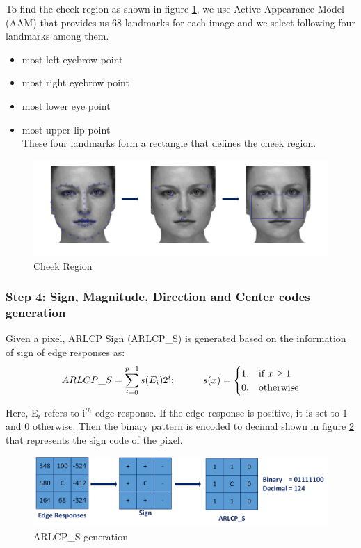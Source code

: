 \documentclass[12pt]{article}
\newcommand\tab[1][1cm]{\hspace*{#1}}
\begin{document}
To find the cheek region as shown in figure \ref{fig:Cheek_Region}, we use Active Appearance Model (AAM) that provides us 68 landmarks for each image and we select following four landmarks among them.
\begin{itemize}
	\item most left eyebrow point
	\item most right eyebrow point
	\item most lower eye point
	\item most upper lip point\\
	These four landmarks form a rectangle that defines the cheek region.	
\end{itemize}  
\begin{figure}[H]
	\begin{center}
		\centering
		\includegraphics[width=\textwidth]{Cheek_Region.png}
		\caption{Cheek Region}
			\label{fig:Cheek_Region}
	\end{center}
\end{figure} 

\subsubsection{Step 4: Sign, Magnitude, Direction and Center codes generation} 
Given a pixel, ARLCP Sign (ARLCP\_S) is generated based on the information of sign of edge responses as:
\begin{equation}
ARLCP\_S=\sum\limits_{i=0}^{p-1}{s({{E}_{i}}){{2}^{i}}}; \tab  s(x)= 
\begin{cases}
1,& \text{if } x\geq 1\\
0,& \text{otherwise}
\end{cases}
\label{equation:ARLCPss}
\end{equation}

Here, E$_i$ refers to i$^{th}$ edge response. If the edge response is positive, it is set to 1 and 0 otherwise. Then the binary pattern is encoded to decimal shown in figure \ref{fig:sign} that represents the sign code of the pixel.
\begin{figure}[H]
	\begin{center}
		\centering
		\includegraphics[width=\textwidth]{sign.png}
		\caption{ARLCP\_S generation}
		\label{fig:sign}
	\end{center}
\end{figure}
\end{document}
